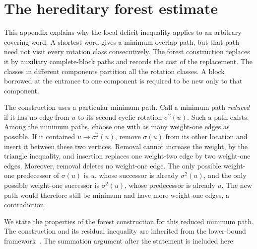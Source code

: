 \section{The hereditary forest estimate}\label{app:forest}

This appendix explains why the local deficit inequality applies to an
arbitrary covering word. A shortest word gives a minimum overlap path,
but that path need not visit every rotation class consecutively. The
forest construction replaces it by auxiliary complete-block paths and
records the cost of the replacement. The classes in different components
partition all the rotation classes. A block borrowed at the entrance to
one component is required to be new only to that component.

The construction uses a particular minimum path. Call a minimum path
\emph{reduced} if it has no edge from $u$ to its second cyclic rotation
$\sigma^2(u)$. Such a path exists. Among the minimum paths, choose one
with as many weight-one edges as possible. If it contained
$u\to\sigma^2(u)$, remove $\sigma(u)$ from its other location and
insert it between these two vertices. Removal cannot increase the weight,
by the triangle inequality, and insertion replaces one weight-two edge
by two weight-one edges. Moreover, removal deletes no weight-one edge.
The only possible weight-one predecessor of $\sigma(u)$ is $u$, whose
successor is already $\sigma^2(u)$, and the only possible weight-one
successor is $\sigma^2(u)$, whose predecessor is already $u$.
The new path would therefore still be minimum and have more weight-one
edges, a contradiction.

We state the properties of the forest construction for this reduced
minimum path. The construction and its residual inequality are inherited
from the lower-bound framework~\cite{pantone-framework}. The summation
argument after the statement is included here.

